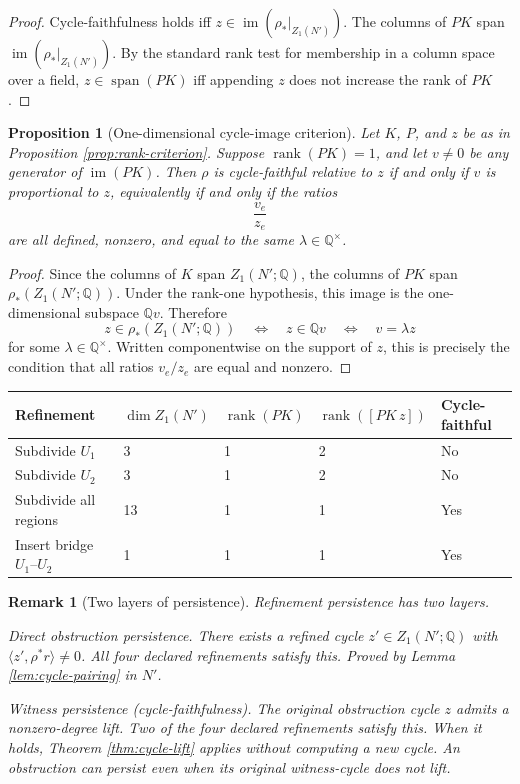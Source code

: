 \documentclass[11pt]{article}
\newtheorem{proposition}[theorem]{Proposition}
\newtheorem{remark}[theorem]{Remark}
\newcommand{\Q}{\mathbb{Q}}
\begin{document}
\begin{proof}
Cycle-faithfulness holds iff \(z\in\operatorname{im}(\rho_*|_{Z_1(N')})\).
The columns of \(PK\) span \(\operatorname{im}(\rho_*|_{Z_1(N')})\). By the
standard rank test for membership in a column space over a field,
\(z\in\operatorname{span}(PK)\) iff appending \(z\) does not increase the
rank of \(PK\).
\end{proof}

\begin{proposition}[One-dimensional cycle-image criterion]\label{prop:rank1-criterion}
Let \(K\), \(P\), and \(z\) be as in Proposition \ref{prop:rank-criterion}.
Suppose \(\operatorname{rank}(PK)=1\), and let \(v\neq 0\) be any generator of
\(\operatorname{im}(PK)\). Then \(\rho\) is cycle-faithful relative to \(z\)
if and only if \(v\) is proportional to \(z\), equivalently if and only if
the ratios
\[
\frac{v_e}{z_e}
\]
are all defined, nonzero, and equal to the same \(\lambda\in\Q^\times\).
\end{proposition}

\begin{proof}
Since the columns of \(K\) span \(Z_1(N';\Q)\), the columns of \(PK\) span
\(\rho_*(Z_1(N';\Q))\). Under the rank-one hypothesis, this image is the
one-dimensional subspace \(\Q v\). Therefore
\[
z\in \rho_*(Z_1(N';\Q))
\quad\Longleftrightarrow\quad
z\in \Q v
\quad\Longleftrightarrow\quad
v=\lambda z
\]
for some \(\lambda\in\Q^\times\). Written componentwise on the support of \(z\),
this is precisely the condition that all ratios \(v_e/z_e\) are equal and nonzero.
\end{proof}

\begin{center}
\begin{tabular}{lllll}
\toprule
Refinement & $\dim Z_1(N')$ & $\operatorname{rank}(PK)$ &
$\operatorname{rank}([PK\,z])$ & Cycle-faithful \\
\midrule
Subdivide \(U_1\) & 3 & 1 & 2 & No \\
Subdivide \(U_2\) & 3 & 1 & 2 & No \\
Subdivide all regions & 13 & 1 & 1 & Yes \\
Insert bridge \(U_1\)--\(U_2\) & 1 & 1 & 1 & Yes \\
\bottomrule
\end{tabular}
\end{center}

\begin{remark}[Two layers of persistence]
Refinement persistence has two layers.

\emph{Direct obstruction persistence.}
There exists a refined cycle \(z'\in Z_1(N';\Q)\) with
\(\langle z',\rho^*r\rangle\neq 0\).
All four declared refinements satisfy this.
Proved by Lemma \ref{lem:cycle-pairing} in \(N'\).

\emph{Witness persistence (cycle-faithfulness).}
The original obstruction cycle \(z\) admits a nonzero-degree lift.
Two of the four declared refinements satisfy this.
When it holds, Theorem \ref{thm:cycle-lift} applies without computing
a new cycle. An obstruction can persist even when its original
witness-cycle does not lift.
\end{remark}
\end{document}
